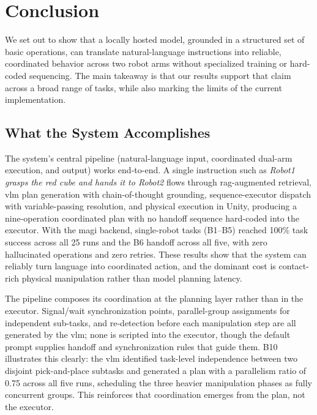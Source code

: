\documentclass[
     12pt,
     a4paper,
     BCOR=10mm,
     DIV=14,
     listof=totoc,
     bibliography=totoc,
     parskip,
     twoside,
     headsepline
     ]{scrreprt}
\begin{document}
\chapter{Conclusion}\label{conclusion}
We set out to show that a locally hosted model, grounded in a structured set of basic operations, can translate natural-language instructions into reliable, coordinated behavior across two robot arms without specialized training or hard-coded sequencing. The main takeaway is that our results support that claim across a broad range of tasks, while also marking the limits of the current implementation.

\section{What the System Accomplishes}
The system's central pipeline (natural-language input, coordinated dual-arm execution, and output) works end-to-end. A single instruction such as \textit{Robot1 grasps the red cube and hands it to Robot2} flows through \gls{rag}-augmented retrieval, \gls{vlm} plan generation with chain-of-thought grounding, sequence-executor dispatch with variable-passing resolution, and physical execution in Unity, producing a nine-operation coordinated plan with no handoff sequence hard-coded into the executor. With the \gls{magi} backend, single-robot tasks (B1--B5) reached 100\% task success across all 25 runs and the B6 handoff across all five, with zero hallucinated operations and zero retries. These results show that the system can reliably turn language into coordinated action, and the dominant cost is contact-rich physical manipulation rather than model planning latency.

The pipeline composes its coordination at the planning layer rather than in the executor. Signal/wait synchronization points, parallel-group assignments for independent sub-tasks, and re-detection before each manipulation step are all generated by the \gls{vlm}; none is scripted into the executor, though the default prompt supplies handoff and synchronization rules that guide them. B10 illustrates this clearly: the \gls{vlm} identified task-level independence between two disjoint pick-and-place subtasks and generated a plan with a parallelism ratio of 0.75 across all five runs, scheduling the three heavier manipulation phases as fully concurrent groups. This reinforces that coordination emerges from the plan, not the executor.
\end{document}
